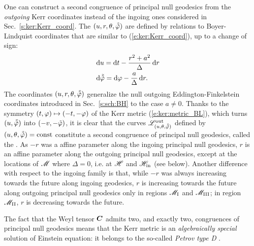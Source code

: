 One can construct a second congruence of principal null geodesics from
the \emph{outgoing} Kerr coordinates instead of the ingoing ones
considered in Sec.~\ref{s:ker:Kerr_coord}. The 
$(u,r,\theta,\tilde{{\tilde\varphi}})$ are defined by relations to Boyer-Lindquist
coordinates that are similar to
(\ref{e:ker:Kerr_coord}), up to a change of sign:
\begin{subequations}
\label{e:ker:out_Kerr_coord}
\begin{align}
& \mathrm{d} u = \mathrm{d} t - \frac{r^2+a^2}{\Delta} \, \mathrm{d} r \\
& \mathrm{d} \tilde{{\tilde\varphi}} = \mathrm{d} \varphi - \frac{a}{\Delta}\, \mathrm{d} r .
\end{align}
\end{subequations}
The coordinates $(u,r,\theta,\tilde{{\tilde\varphi}})$ generalize the null
outgoing Eddington-Finkelstein
coordinates introduced in Sec.~\ref{s:sch:BH} to the case $a\not=0$.
Thanks to the symmetry $(t,\varphi)\mapsto(-t,-\varphi)$ of the Kerr metric (\ref{e:ker:metric_BL}), which turns $(u,\tilde{{\tilde\varphi}})$ into $(-v,-{\tilde\varphi})$, it is clear that the curves $\mathscr{L}^{\rm out}_{(u,\theta,\tilde{{\tilde\varphi}})}$
defined by $(u,\theta,\tilde{{\tilde\varphi}})=\mathrm{const}$ constitute a second
congruence of principal null geodesics, called the . As $-r$ was a affine parameter along
the ingoing principal null geodesics, $r$ is an affine parameter along
the outgoing principal null geodesics,
 except at the locations of $\mathscr{M}$ where $\Delta=0$,
i.e. at $\mathscr{H}$ and $\mathscr{H}_{\rm in}$ (see below). Another difference
with respect to the ingoing family is that, while $-r$ was always
increasing towards the future along ingoing geodesics,
 $r$ is increasing towards the future
along outgoing principal null geodesics only in regions
$\mathscr{M}_{\rm I}$ and $\mathscr{M}_{\rm III}$; in region $\mathscr{M}_{\rm II}$,
$r$ is decreasing towards the future.

The fact that the Weyl tensor $\bm{C}$
admits two, and exactly two, congruences of principal null geodesics
means that the Kerr metric is an \emph{algebraically special} solution of
Einstein equation: it belongs to the so-called \emph{Petrov type D}
\cite{ONeil95}.

